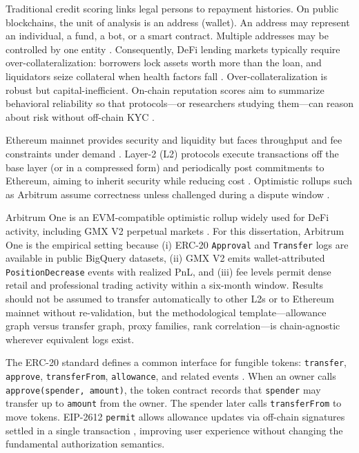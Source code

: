 
Traditional credit scoring links legal persons to repayment histories. On public blockchains, the unit of analysis is an address (wallet). An address may represent an individual, a fund, a bot, or a smart contract. Multiple addresses may be controlled by one entity . Consequently, DeFi lending markets typically require over-collateralization: borrowers lock assets worth more than the loan, and liquidators seize collateral when health factors fall . Over-collateralization is robust but capital-inefficient. On-chain reputation scores aim to summarize behavioral reliability so that protocols---or researchers studying them---can reason about risk without off-chain KYC .


Ethereum mainnet provides security and liquidity but faces throughput and fee constraints under demand . Layer-2 (L2) protocols execute transactions off the base layer (or in a compressed form) and periodically post commitments to Ethereum, aiming to inherit security while reducing cost . Optimistic rollups such as Arbitrum assume correctness unless challenged during a dispute window .

Arbitrum One is an EVM-compatible optimistic rollup widely used for DeFi activity, including GMX V2 perpetual markets . For this dissertation, Arbitrum One is the empirical setting because (i) ERC-20 \texttt{Approval} and \texttt{Transfer} logs are available in public BigQuery datasets, (ii) GMX V2 emits wallet-attributed \texttt{PositionDecrease} events with realized PnL, and (iii) fee levels permit dense retail and professional trading activity within a six-month window. Results should not be assumed to transfer automatically to other L2s or to Ethereum mainnet without re-validation, but the methodological template---allowance graph versus transfer graph, proxy families, rank correlation---is chain-agnostic wherever equivalent logs exist.


The ERC-20 standard defines a common interface for fungible tokens: \texttt{transfer}, \texttt{approve}, \texttt{transferFrom}, \texttt{allowance}, and related events . When an owner calls \texttt{approve(spender, amount)}, the token contract records that \texttt{spender} may transfer up to \texttt{amount} from the owner. The spender later calls \texttt{transferFrom} to move tokens. EIP-2612 \texttt{permit} allows allowance updates via off-chain signatures settled in a single transaction , improving user experience without changing the fundamental authorization semantics.

